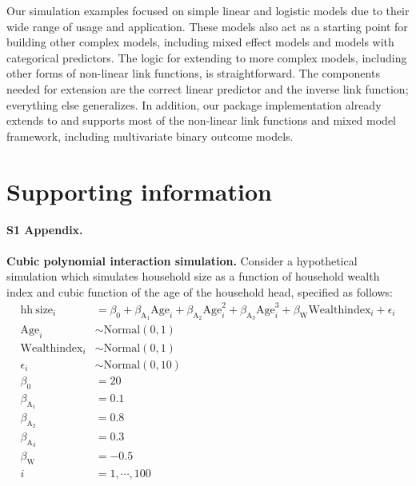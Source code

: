 Our simulation examples focused on simple linear and logistic models due to their wide range of usage and application. These models also act as a starting point for building other complex models, including mixed effect models and models with categorical predictors. The logic for extending to more complex models, including other forms of non-linear link functions, is straightforward. The components needed for extension are the correct linear predictor and the inverse link function; everything else generalizes. In addition, our  package implementation already extends to and supports most of the non-linear link functions and mixed model framework, including multivariate binary outcome models.

\section{Supporting information}

\paragraph*{S1 Appendix.}
\label{S1_Appendix}
{\bf Cubic polynomial interaction simulation.} Consider a hypothetical simulation which simulates household size as a function of household wealth index and cubic function of the age of the household head, specified as follows:
%
\begin{align}\label{sim:lm_cubic}
\mathrm{hh~size}_i &= \beta_0 + \beta_{\mathrm{A_1}}\mathrm{Age}_i + \beta_{\mathrm{A_2}}\mathrm{Age}^2_i + \beta_{\mathrm{A_3}}\mathrm{Age}^3_i + \beta_{\mathrm{W}}\mathrm{Wealthindex}_i + \epsilon_i \nonumber\\
\mathrm{Age}_i &\sim \mathrm{Normal}(0, 1) \nonumber\\
\mathrm{Wealthindex}_i &\sim \mathrm{Normal}(0, 1) \nonumber\\
\epsilon_i &\sim \mathrm{Normal}(0, 10) \nonumber\\
\beta_0 &= 20 \nonumber\\
\beta_{\mathrm{A}_1} &= 0.1 \nonumber\\
\beta_{\mathrm{A}_2} &= 0.8 \nonumber\\
\beta_{\mathrm{A}_3} &= 0.3 \nonumber\\
\beta_{\mathrm{W}} &= -0.5 \nonumber\\
i &= 1,\cdots, 100
\end{align}



